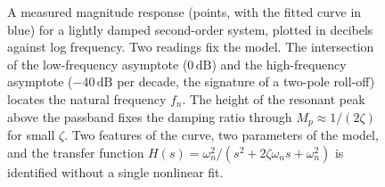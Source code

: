 \begin{figure}[htbp]
{%
}%
\caption[Reading a second-order transfer characteristic from its
magnitude response]{A measured magnitude response (points, with the
fitted curve in blue) for a lightly damped second-order system,
plotted in decibels against log frequency. Two readings fix the model.
The intersection of the low-frequency asymptote ($0\,\si{\deci\bel}$)
and the high-frequency asymptote ($-40\,\si{\deci\bel}$ per decade,
the signature of a two-pole roll-off) locates the natural frequency
$f_{n}$. The height of the resonant peak above the passband fixes the
damping ratio through $M_{p}\approx 1/(2\zeta)$ for small $\zeta$. Two
features of the curve, two parameters of the model, and the transfer
function $H(s)=\omega_{n}^{2}/(s^{2}+2\zeta\omega_{n}s+\omega_{n}^{2})$
is identified without a single nonlinear fit.}
\label{fig:vol02:ch02:second-order-bode}
\end{figure}
